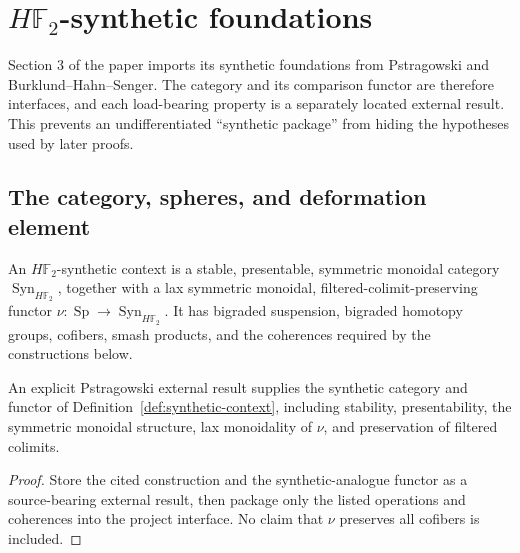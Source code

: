 \chapter{$H\mathbb F_2$-synthetic foundations}
\label{chap:synthetic-foundations}

Section 3 of the paper imports its synthetic foundations from Pstragowski and
Burklund--Hahn--Senger.  The category and its comparison functor are therefore
interfaces, and each load-bearing property is a separately located external
result.  This prevents an undifferentiated ``synthetic package'' from hiding
the hypotheses used by later proofs.

\section{The category, spheres, and deformation element}

\begin{definition}
  \label{def:synthetic-context}
  \notready
  An $H\mathbb F_2$-synthetic context is a stable, presentable, symmetric
  monoidal category $\operatorname{Syn}_{H\mathbb F_2}$, together with a lax
  symmetric monoidal, filtered-colimit-preserving functor
  $\nu:\operatorname{Sp}\to\operatorname{Syn}_{H\mathbb F_2}$.  It has
  bigraded suspension, bigraded homotopy groups, cofibers, smash products, and
  the coherences required by the constructions below.
\end{definition}

\begin{theorem}
  \label{thm:external-synthetic-foundation}
  \notready
  An explicit Pstragowski external result supplies the synthetic category and
  functor of Definition~\ref{def:synthetic-context}, including stability,
  presentability, the symmetric monoidal structure, lax monoidality of $\nu$,
  and preservation of filtered colimits.
\end{theorem}

\begin{proof}
  Store the cited construction and the synthetic-analogue functor as a
  source-bearing external result, then package only the listed operations and
  coherences into the project interface.  No claim that $\nu$ preserves all
  cofibers is included.
\end{proof}

